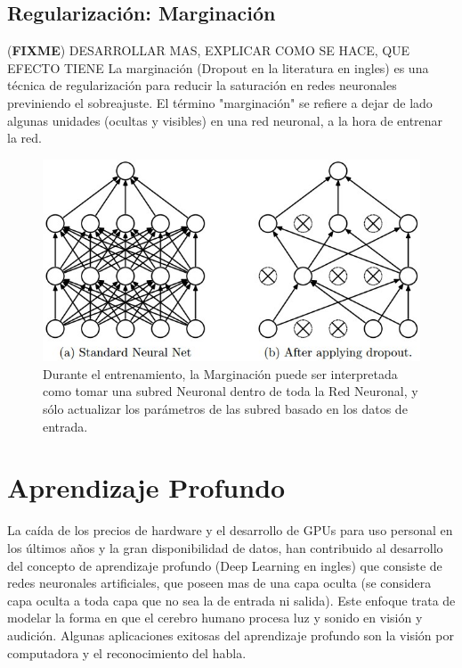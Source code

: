 \documentclass[a4paper,11pt,spanish]{book}
\newcommand*{\FIXME}[1]{{(\textbf{FIXME}) {#1}}}
\begin{document}
      \subsection {Regularización: Marginación}
	\FIXME{DESARROLLAR MAS, EXPLICAR COMO SE HACE, QUE EFECTO TIENE}
	La marginación (Dropout en la literatura en ingles) es una técnica de regularización para reducir la saturación en redes neuronales previniendo el sobreajuste.
	El término "marginación" se refiere a dejar de lado algunas unidades (ocultas y visibles) en una red neuronal, a la hora de entrenar la red.
	\begin{figure}[H]
	  \begin{center}
	   \includegraphics[width=0.6\linewidth]{./img/dropout.jpeg}
	  \end{center}
	  \caption{Durante el entrenamiento, la Marginación puede ser interpretada como tomar una subred Neuronal dentro de toda la Red Neuronal, y sólo actualizar los parámetros
	  de las subred basado en los datos de entrada. \cite{Srivastava:Dropout} }
	  \label{fig:dropout}
	\end{figure}

  \section {Aprendizaje Profundo}
    La caída de los precios de hardware y el desarrollo de GPUs para uso personal en los últimos años y la gran disponibilidad de datos, han contribuido al desarrollo del
    concepto de aprendizaje profundo (Deep Learning en ingles)
    que consiste de redes neuronales artificiales, que poseen mas de una capa oculta (se considera capa oculta a toda capa que no sea la de entrada ni salida). Este enfoque trata de
    modelar la forma en que el cerebro humano procesa luz y sonido en visión y audición.
    Algunas aplicaciones exitosas del aprendizaje profundo son la visión por computadora y el reconocimiento del habla.
\end{document}

